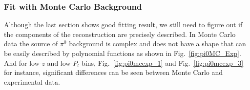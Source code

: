 \subsubsection{Fit with Monte Carlo Background}
Although the last section shows good fitting result, we still need to figure out if the components of the reconstruction are precisely described. In Monte Carlo data the source of $\pi^0$ background is complex and does not have a shape that can be easily described by polynomial functions as shown in Fig.~\ref{fig:pi0MC_Exp}. And for low-$z$ and low-$P_t$ bins, Fig.~\ref{fig:pi0mcexp_1} and Fig.~\ref{fig:pi0mcexp_3} for instance, significant differences can be seen between Monte Carlo and experimental data.
\begin{figure}[H]
  \centering     

\end{figure}
